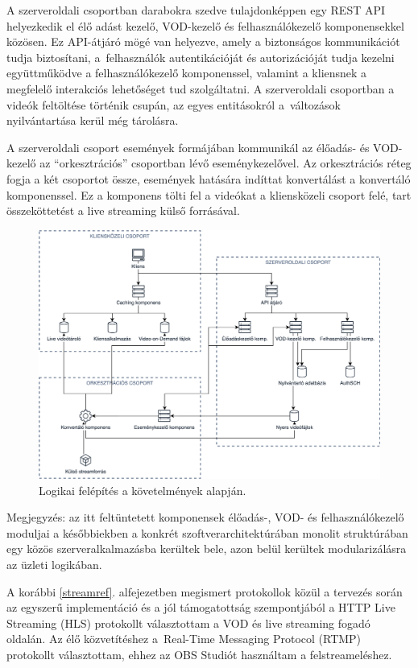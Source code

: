 A szerveroldali csoportban darabokra szedve tulajdonképpen egy REST API helyezkedik el élő adást kezelő, VOD-kezelő és felhasználókezelő komponensekkel közösen. Ez API-átjáró mögé van helyezve, amely a biztonságos kommunikációt tudja biztosítani, a~felhasználók autentikációját és autorizációját tudja kezelni együttműködve a felhasználókezelő komponenssel, valamint a kliensnek a megfelelő interakciós lehetőséget tud szolgáltatni. A szerveroldali csoportban a videók feltöltése történik csupán, az egyes entitásokról a~változások nyilvántartása kerül még tárolásra.

A szerveroldali csoport események formájában kommunikál az élőadás- és VOD-kezelő az ``orkesztrációs'' csoportban lévő eseménykezelővel. Az orkesztrációs réteg fogja a két csoportot össze, események hatására indíttat konvertálást a konvertáló komponenssel. Ez a komponens tölti fel a videókat a kliensközeli csoport felé, tart összeköttetést a live streaming külső forrásával.

\begin{figure}[h]
	\centering
	\includegraphics[width=150mm, keepaspectratio]{figures/dipterv_highlevel.png}
	\caption{Logikai felépítés a követelmények alapján.}
	\label{fig:highlevel}
\end{figure}

Megjegyzés: az itt feltüntetett komponensek élőadás-, VOD- és felhasználókezelő moduljai a későbbiekben a konkrét szoftverarchitektúrában monolit struktúrában egy közös szerveralkalmazásba kerültek bele, azon belül kerültek modularizálásra az üzleti logikában.

A korábbi \ref{streamref}. alfejezetben megismert protokollok közül a tervezés során az egyszerű implementáció és a jól támogatottság szempontjából a HTTP Live Streaming (HLS) protokollt választottam a VOD és live streaming fogadó oldalán. Az élő közvetítéshez a~Real-Time Messaging Protocol (RTMP) protokollt választottam, ehhez az OBS Studiót használtam a felstreameléshez.

